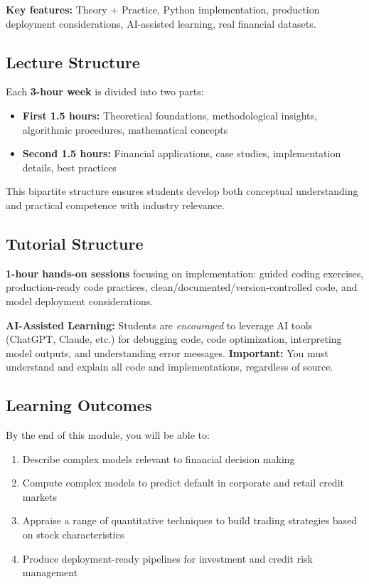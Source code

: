 \documentclass[11pt,a4paper]{article}
\begin{document}
\noindent\textbf{Key features:} Theory + Practice, Python implementation, production deployment considerations, AI-assisted learning, real financial datasets.

\subsection{Lecture Structure}

Each \textbf{3-hour week} is divided into two parts:

\begin{itemize}[leftmargin=*]
    \item \textbf{First 1.5 hours:} Theoretical foundations, methodological insights, algorithmic procedures, mathematical concepts
    \item \textbf{Second 1.5 hours:} Financial applications, case studies, implementation details, best practices
\end{itemize}

This bipartite structure ensures students develop both conceptual understanding and practical competence with industry relevance.

\subsection{Tutorial Structure}

\textbf{1-hour hands-on sessions} focusing on implementation: guided coding exercises, production-ready code practices, clean/documented/version-controlled code, and model deployment considerations.

\textbf{AI-Assisted Learning:} Students are \emph{encouraged} to leverage AI tools (ChatGPT, Claude, etc.) for debugging code, code optimization, interpreting model outputs, and understanding error messages. \textbf{Important:} You must understand and explain all code and implementations, regardless of source.

\subsection{Learning Outcomes}

By the end of this module, you will be able to:

\begin{enumerate}[leftmargin=*]
    \item Describe complex models relevant to financial decision making
    \item Compute complex models to predict default in corporate and retail credit markets
    \item Appraise a range of quantitative techniques to build trading strategies based on stock characteristics
    \item Produce deployment-ready pipelines for investment and credit risk management
\end{enumerate}
\end{document}
